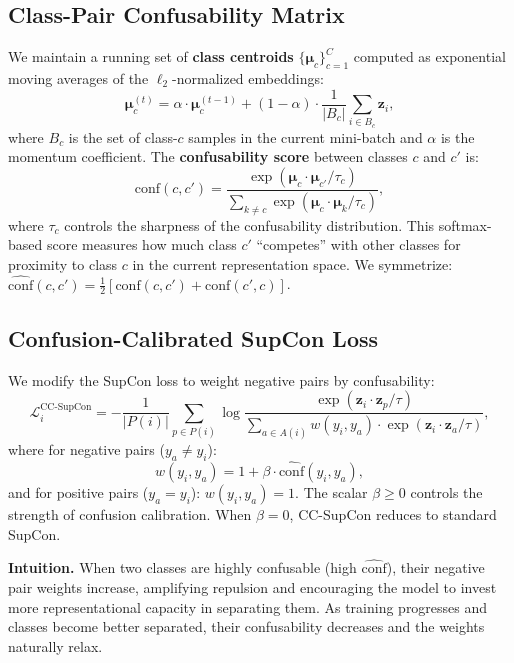 \documentclass{article}
\newcommand{\conf}{\widehat{\mathrm{conf}}}
\newcommand{\bz}{\mathbf{z}}
\newcommand{\bmu}{\boldsymbol{\mu}}
\begin{document}
\subsection{Class-Pair Confusability Matrix}
\label{sec:confusability}

We maintain a running set of \textbf{class centroids} $\{\bmu_c\}_{c=1}^{C}$ computed as exponential moving averages of the $\ell_2$-normalized embeddings:
\begin{equation}
\bmu_c^{(t)} = \alpha \cdot \bmu_c^{(t-1)} + (1-\alpha) \cdot \frac{1}{|B_c|}\sum_{i \in B_c} \bz_i,
\label{eq:centroid}
\end{equation}
where $B_c$ is the set of class-$c$ samples in the current mini-batch and $\alpha$ is the momentum coefficient. The \textbf{confusability score} between classes $c$ and $c'$ is:
\begin{equation}
\mathrm{conf}(c, c') = \frac{\exp(\bmu_c \cdot \bmu_{c'} / \tau_c)}{\sum_{k \neq c} \exp(\bmu_c \cdot \bmu_k / \tau_c)},
\label{eq:conf}
\end{equation}
where $\tau_c$ controls the sharpness of the confusability distribution. This softmax-based score measures how much class $c'$ ``competes'' with other classes for proximity to class $c$ in the current representation space. We symmetrize: $\conf(c, c') = \tfrac{1}{2}[\mathrm{conf}(c, c') + \mathrm{conf}(c', c)]$.

\subsection{Confusion-Calibrated SupCon Loss}

We modify the SupCon loss to weight negative pairs by confusability:
\begin{equation}
\mathcal{L}_i^{\text{CC-SupCon}} = -\frac{1}{|P(i)|} \sum_{p \in P(i)} \log \frac{\exp(\bz_i \cdot \bz_p / \tau)}{\sum_{a \in A(i)} w(y_i, y_a) \cdot \exp(\bz_i \cdot \bz_a / \tau)},
\label{eq:ccsupcon}
\end{equation}
where for negative pairs ($y_a \neq y_i$):
\begin{equation}
w(y_i, y_a) = 1 + \beta \cdot \conf(y_i, y_a),
\label{eq:weight}
\end{equation}
and for positive pairs ($y_a = y_i$): $w(y_i, y_a) = 1$. The scalar $\beta \geq 0$ controls the strength of confusion calibration. When $\beta = 0$, CC-SupCon reduces to standard SupCon.

\textbf{Intuition.} When two classes are highly confusable (high $\conf$), their negative pair weights increase, amplifying repulsion and encouraging the model to invest more representational capacity in separating them. As training progresses and classes become better separated, their confusability decreases and the weights naturally relax.
\end{document}
